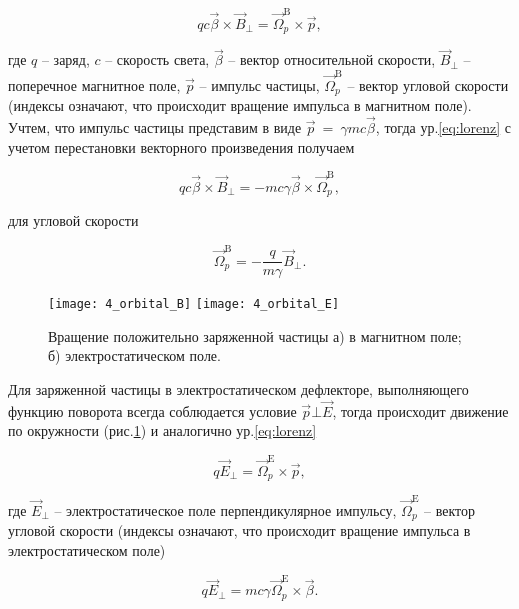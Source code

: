 \begin{equation} \label{eq:lorenz}
qc\vec{\beta}\times{\vec{B}}_\bot={\vec{\Omega}}_p^{\textrm{B}}\times\vec{p},
\end{equation}

\noindent где $q$ -- заряд, $c$ -- скорость света, $\vec{\beta}$ -- вектор относительной скорости, ${\vec{B}}_\bot$ -- поперечное магнитное поле, $\vec{p}$ -- импульс частицы, ${\vec{\Omega}}_p^{\textrm{B}}$ -- вектор угловой скорости (индексы означают, что происходит вращение импульса в магнитном поле). Учтем, что импульс частицы представим в виде $\vec{p}\ =\ \gamma mc\vec{\beta}$, тогда ур.\ref{eq:lorenz} с учетом перестановки векторного произведения получаем

\begin{equation}	
qc\vec{\beta}\times{\vec{B}}_\bot=-mc\gamma\vec{\beta}\times{\vec{\Omega}}_p^{\textrm{B}},
\end{equation}

\noindent для угловой скорости

\begin{equation} \label{eq:omega_pB}
 {\vec{\Omega}}_p^{\textrm{B}}=-\frac{q}{m\gamma}{\vec{B}}_\bot.
\end{equation} 

\begin{figure}[!h]
  \centering
	\texttt{[image: 4\_orbital\_B]}
	\texttt{[image: 4\_orbital\_E]}
   \caption{Вращение положительно заряженной частицы а) в магнитном поле; б) электростатическом поле.}
   \label{fig:4_orbital_B_E}
\end{figure}

\par Для заряженной частицы в электростатическом дефлекторе, выполняющего функцию поворота всегда соблюдается условие $\vec{p} \bot \vec{E}$, тогда происходит движение по окружности (рис.\ref{fig:4_orbital_B_E}) и аналогично ур.\ref{eq:lorenz}

\begin{equation}
q{\vec{E}}_\bot={\vec{\Omega}}_p^{\textrm{E}}\times\vec{p},
\end{equation} 

\noindent где ${\vec{E}}_\bot$ – электростатическое поле перпендикулярное импульсу, ${\vec{\Omega}}_p^{\textrm{E}}$ – вектор угловой скорости (индексы означают, что происходит вращение импульса в электростатическом поле)

\begin{equation}
q{\vec{E}}_\bot=mc\gamma{\vec{\Omega}}_p^{\textrm{E}}\times\vec{\beta}.
\end{equation} 

